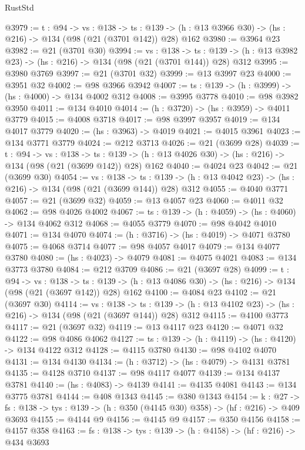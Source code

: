 \begin{lexlean}{RustStd}
\begin{coremodule}
@3979 := {t : @94} ->
  {vs : @138} ->
  {ts : @139} -> (h : @13 @3966 @30) -> (hs : @216) -> @134 (@98 (@21 (@3701 @142)) @28) @162
@3980 := @3964 @23
@3982 := @21 (@3701 @30)
@3994 := {vs : @138} ->
  {ts : @139} -> (h : @13 @3982 @23) -> (hs : @216) -> @134 (@98 (@21 (@3701 @144)) @28) @312
@3995 := @3980 @3769
@3997 := @21 (@3701 @32)
@3999 := @13 @3997 @23
@4000 := @3951 @32
@4002 := @98 @3966 @3942
@4007 := {ts : @139} -> (h : @3999) -> (hs : @4000) -> @134 @4002 @312
@4008 := @3995 @3778
@4010 := @98 @3982 @3950
@4011 := @134 @4010
@4014 := (h : @3720) -> (hs : @3959) -> @4011 @3779
@4015 := @4008 @3718
@4017 := @98 @3997 @3957
@4019 := @134 @4017 @3779
@4020 := (hs : @3963) -> @4019
@4021 := @4015 @3961
@4023 := @134 @3771 @3779
@4024 := @212 @3713
@4026 := @21 (@3699 @28)
@4039 := {t : @94} ->
  {vs : @138} ->
  {ts : @139} -> (h : @13 @4026 @30) -> (hs : @216) -> @134 (@98 (@21 (@3699 @142)) @28) @162
@4040 := @4024 @23
@4042 := @21 (@3699 @30)
@4054 := {vs : @138} ->
  {ts : @139} -> (h : @13 @4042 @23) -> (hs : @216) -> @134 (@98 (@21 (@3699 @144)) @28) @312
@4055 := @4040 @3771
@4057 := @21 (@3699 @32)
@4059 := @13 @4057 @23
@4060 := @4011 @32
@4062 := @98 @4026 @4002
@4067 := {ts : @139} -> (h : @4059) -> (hs : @4060) -> @134 @4062 @312
@4068 := @4055 @3779
@4070 := @98 @4042 @4010
@4071 := @134 @4070
@4074 := (h : @3716) -> (hs : @4019) -> @4071 @3780
@4075 := @4068 @3714
@4077 := @98 @4057 @4017
@4079 := @134 @4077 @3780
@4080 := (hs : @4023) -> @4079
@4081 := @4075 @4021
@4083 := @134 @3773 @3780
@4084 := @212 @3709
@4086 := @21 (@3697 @28)
@4099 := {t : @94} ->
  {vs : @138} ->
  {ts : @139} -> (h : @13 @4086 @30) -> (hs : @216) -> @134 (@98 (@21 (@3697 @142)) @28) @162
@4100 := @4084 @23
@4102 := @21 (@3697 @30)
@4114 := {vs : @138} ->
  {ts : @139} -> (h : @13 @4102 @23) -> (hs : @216) -> @134 (@98 (@21 (@3697 @144)) @28) @312
@4115 := @4100 @3773
@4117 := @21 (@3697 @32)
@4119 := @13 @4117 @23
@4120 := @4071 @32
@4122 := @98 @4086 @4062
@4127 := {ts : @139} -> (h : @4119) -> (hs : @4120) -> @134 @4122 @312
@4128 := @4115 @3780
@4130 := @98 @4102 @4070
@4131 := @134 @4130
@4134 := (h : @3712) -> (hs : @4079) -> @4131 @3781
@4135 := @4128 @3710
@4137 := @98 @4117 @4077
@4139 := @134 @4137 @3781
@4140 := (hs : @4083) -> @4139
@4141 := @4135 @4081
@4143 := @134 @3775 @3781
@4144 := @408 @1343
@4145 := @380 @1343
@4154 := {k : @27} ->
  {fs : @138} -> {tys : @139} -> (h : @350 (@4145 @30) @358) -> (hf : @216) -> @409 @3693
@4155 := @4144 @9
@4156 := @4145 @9
@4157 := @350 @4156
@4158 := @4157 @358
@4163 := {fs : @138} -> {tys : @139} -> (h : @4158) -> (hf : @216) -> @434 @3693

\end{coremodule}
\end{lexlean}
